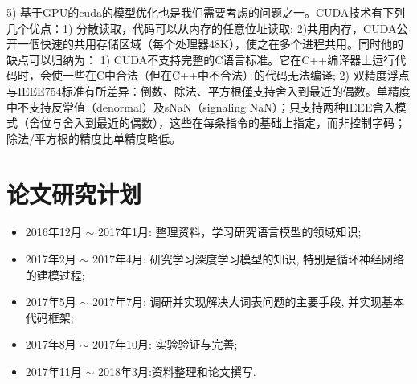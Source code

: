 \documentclass[twoside]{buaathesis}
\begin{document}
5) 基于GPU的cuda的模型优化也是我们需要考虑的问题之一。CUDA技术有下列几个优点：1) 分散读取，代码可以从内存的任意位址读取; 2)共用内存，CUDA公开一個快速的共用存储区域（每个处理器48K），使之在多个进程共用。同时他的缺点可以归纳为： 1) CUDA不支持完整的C语言标准。它在C++编译器上运行代码时，会使一些在C中合法（但在C++中不合法）的代码无法编译; 2) 双精度浮点与IEEE754标准有所差异：倒数、除法、平方根僅支持舍入到最近的偶数。单精度中不支持反常值（denormal）及sNaN（signaling NaN）；只支持两种IEEE舍入模式（舍位与舍入到最近的偶数），这些在每条指令的基础上指定，而非控制字码；除法/平方根的精度比单精度略低。

\section{论文研究计划}
\begin{itemize}
  \item 2016年12月 $\sim$ 2017年1月: 整理资料，学习研究语言模型的领域知识;
  \item 2017年2月 $\sim$ 2017年4月: 研究学习深度学习模型的知识, 特别是循环神经网络的建模过程;
  \item 2017年5月 $\sim$ 2017年7月: 调研并实现解决大词表问题的主要手段, 并实现基本代码框架;
  \item 2017年8月 $\sim$ 2017年10月: 实验验证与完善;
  \item 2017年11月 $\sim$ 2018年3月:资料整理和论文撰写.
\end{itemize}

\newpage
{}

\end{document}
